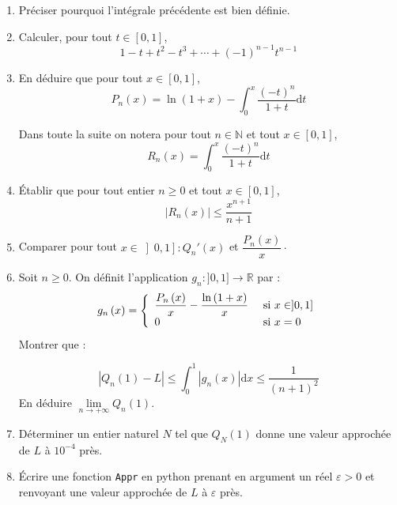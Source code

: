 \documentclass[a4paper,french,11pt,twoside]{VcCours}
\newcommand{\dt}{\text{d}t}
\newcommand{\dx}{\text{d}x}
\begin{document}
\begin{enumerate}
\item Préciser pourquoi l'intégrale précédente est bien définie.

\item Calculer, pour tout $t \in [0,1]$, 
$$1-t+t^{2}-t^{3}+\cdots+\left(  -1\right)  ^{n-1}t^{n-1}$$

\item En déduire que pour tout $x \in [0,1]$,
$$P_{n}\left(
x\right)  =\ln\left(  1+x\right)  -%
{\int_{0}^{x}}
\dfrac{\left(  -t\right)  ^{n}}{1+t}\dt$$

\medskip

\noindent Dans toute la suite on notera pour tout $n\in\mathbb{N}$ et tout $x\in\left[  0,1\right]$,
$$ R_{n}\left(  x\right)  =%
{\int_{0}^{x}}
\dfrac{\left(  -t\right)  ^{n}}{1+t}\dt$$

\item Établir que pour tout entier $n \geq 0$ et tout $x \in [0,1]$,
$$ \left\vert R_{n}\left(  x\right)  \right\vert \leq
\dfrac{x^{n+1}}{n+1}$$

\item Comparer pour tout $x\in\left]  0,1\right]  :Q_{n}' \left(
x\right)  $ et $\dfrac{P_{n}\left(  x\right)  }{x} \cdot$

\item Soit $n \geq 0$. On définit l'application $g_n : ]0,1] \rightarrow \mathbb{R}$ par :
$$ g_n\left(  x\right)  = \left\lbrace \begin{array}{ll}
\dfrac{P_{n}\left(  x\right)  }%
{x}-\dfrac{\ln\left(  1+x\right)  }{x} & \hbox{ si } x \in ]0,1] \\
 0 & \hbox{ si } x = 0 \\
 \end{array}\right.$$
Montrer que :

\[
\left\vert Q_{n}\left(  1\right)  -L\right\vert \leq\int_{0}^{1}\left\vert
g_{n}\left(  x\right)  \right\vert \dx\leq\dfrac{1}{\left(  n+1\right)  ^{2}}%
\]
En déduire $\lim\limits_{n\rightarrow+\infty}Q_{n}\left(  1\right).$

\item Déterminer un entier naturel $N$ tel que $Q_{N}\left(  1\right)  $ donne
une valeur approchée de $L$ à $10^{-4}$ près.
\item Écrire une fonction {\tt Appr} en python prenant en argument un réel $\varepsilon>0$ et renvoyant une valeur approchée de $L$ à $\varepsilon$ près.
\end{enumerate}
\end{document}
